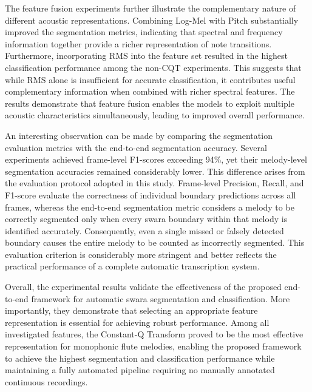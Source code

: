 The feature fusion experiments further illustrate the complementary nature of different acoustic representations. Combining Log-Mel with Pitch substantially improved the segmentation metrics, indicating that spectral and frequency information together provide a richer representation of note transitions. Furthermore, incorporating RMS into the feature set resulted in the highest classification performance among the non-CQT experiments. This suggests that while RMS alone is insufficient for accurate classification, it contributes useful complementary information when combined with richer spectral features. The results demonstrate that feature fusion enables the models to exploit multiple acoustic characteristics simultaneously, leading to improved overall performance.

An interesting observation can be made by comparing the segmentation evaluation metrics with the end-to-end segmentation accuracy. Several experiments achieved frame-level F1-scores exceeding 94\%, yet their melody-level segmentation accuracies remained considerably lower. This difference arises from the evaluation protocol adopted in this study. Frame-level Precision, Recall, and F1-score evaluate the correctness of individual boundary predictions across all frames, whereas the end-to-end segmentation metric considers a melody to be correctly segmented only when every swara boundary within that melody is identified accurately. Consequently, even a single missed or falsely detected boundary causes the entire melody to be counted as incorrectly segmented. This evaluation criterion is considerably more stringent and better reflects the practical performance of a complete automatic transcription system.

Overall, the experimental results validate the effectiveness of the proposed end-to-end framework for automatic swara segmentation and classification. More importantly, they demonstrate that selecting an appropriate feature representation is essential for achieving robust performance. Among all investigated features, the Constant-Q Transform proved to be the most effective representation for monophonic flute melodies, enabling the proposed framework to achieve the highest segmentation and classification performance while maintaining a fully automated pipeline requiring no manually annotated continuous recordings.
